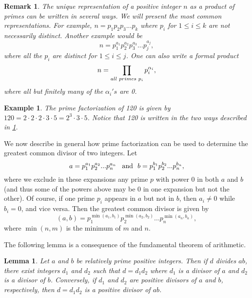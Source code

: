 \documentclass[12pt,letterpaper]{book}
\newtheorem{lemma}{Lemma}
\newtheorem{remark}{Remark}
\newtheorem{example}{Example}
\begin{document}
\begin{remark}\label{remark1}
The unique representation of a positive integer $n$ as a product of
primes can be written in several ways.  We will present the most
common representations. For example, $n=p_1p_2p_3...p_k$ where $p_i$
for $1\leq i\leq k$ are not necessarily distinct. Another example
would be
\begin{equation}
n=p_1^{a_1}p_2^{a_2}p_3^{a_3}...p_j^{a_j},
\end{equation}
where all the
$p_i$ are distinct for $1\leq i\leq j$. One can also write a formal product
\begin{equation}
n=\prod_{all\hspace{0.1cm} primes\hspace{0.1cm} p_i}p_i^{\alpha_i},
\end{equation}
where all but finitely many of the $\alpha_i's$ are 0.
\end{remark}


\begin{example}
The prime factorization of 120 is given by $120=2\cdot 2\cdot 2\cdot
3\cdot 5=2^3\cdot 3\cdot 5$. Notice that 120 is written in the two
ways described in \ref{remark1}.
\end{example}

We now describe in general how prime factorization can be used to
determine the greatest common divisor of two integers. Let
\begin{equation*}
a=p_1^{a_1}p_2^{a_2}...p_n^{a_n} \hspace{0.3cm}\mbox{and} \ \
b=p_1^{b_1}p_2^{b_2}...p_n^{b_n},
\end{equation*}
where we exclude in these expansions any prime $p$ with power 0 in both $a$ and $b$
(and thus some of the powers above may be 0 in one expansion but not the other). Of course,
if one prime $p_i$ appears in $a$ but not in $b$, then
$a_i\neq 0$ while $b_i=0$, and vice versa. Then the greatest common divisor is given by
\begin{equation*}
(a,b)=p_1^{\min(a_1,b_1)}p_2^{\min(a_2,b_2)}...p_n^{\min(a_n,b_n)},
\end{equation*}
where $\min(n,m)$ is the minimum of $m$ and $n$.
\par The following lemma is a consequence of the fundamental
theorem of arithmetic.

\begin{lemma}
Let $a$ and $b$ be relatively prime positive integers.  Then if $d$
divides $ab$, there exist integers $d_1$ and $d_2$ such that $d=d_1d_2$
where $d_1$ is a divisor of $a$ and $d_2$ is a divisor of $b$.
Conversely, if $d_1$ and $d_2$ are positive divisors of $a$ and $b$,
respectively, then $d=d_1d_2$ is a positive divisor of $ab$.
\end{lemma}
\end{document}

